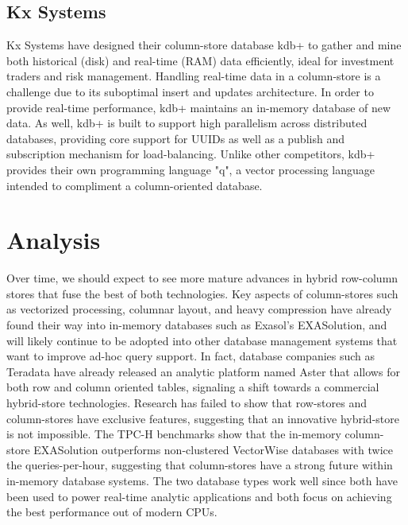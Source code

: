 \documentclass[11pt,a4paper]{report}
\begin{document}
\subsection{Kx Systems}
Kx Systems have designed their column-store database kdb+ to gather and mine both historical (disk) and real-time (RAM) data efficiently, ideal for investment traders and risk management.\cite{kxwp} Handling real-time data in a column-store is a challenge due to its suboptimal insert and updates architecture. In order to provide real-time performance, kdb+ maintains an in-memory database of new data.\cite{kxwp} As well, kdb+ is built to support high parallelism across distributed databases, providing core support for UUIDs as well as a publish and subscription mechanism for load-balancing.\cite{kxwp} Unlike other competitors, kdb+ provides their own programming language "q", a vector processing language intended to compliment a column-oriented database.\cite{kxwp}

\section{Analysis}
Over time, we should expect to see more mature advances in hybrid row-column stores that fuse the best of both technologies. Key aspects of column-stores such as vectorized processing, columnar layout, and heavy compression have already found their way into in-memory databases such as Exasol's EXASolution, and will likely continue to be adopted into other database management systems that want to improve ad-hoc query support. In fact, database companies such as Teradata have already released an analytic platform named Aster that allows for both row and column oriented tables, signaling a shift towards a commercial hybrid-store technologies. \cite{asterdata} Research has failed to show that row-stores and column-stores have exclusive features, suggesting that an innovative hybrid-store is not impossible. \cite{abadi2008column} The TPC-H benchmarks\cite{tpchbm} show that the in-memory column-store EXASolution outperforms non-clustered VectorWise databases with twice the queries-per-hour, suggesting that column-stores have a strong future within in-memory database systems. The two database types work well since both have been used to power real-time analytic applications and both focus on achieving the best performance out of modern CPUs. 
\end{document}
